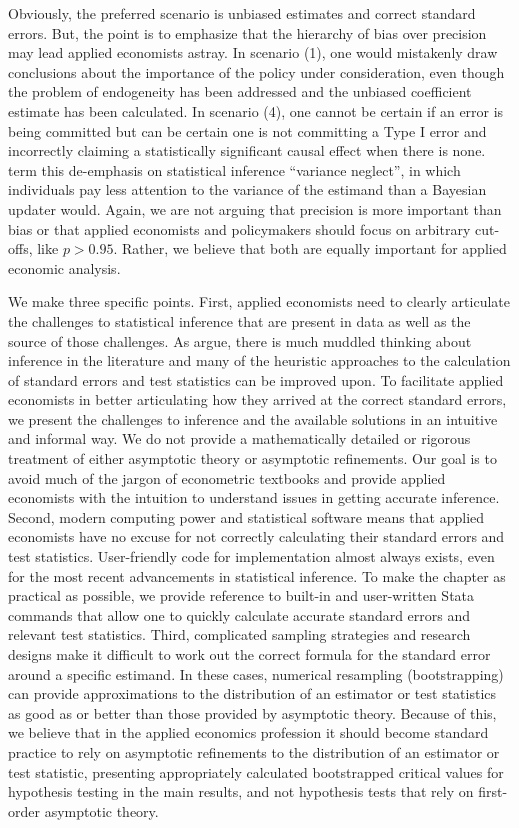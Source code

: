 \documentclass[11pt]{article}
\begin{document}
Obviously, the preferred scenario is unbiased estimates and correct standard errors. But, the point is to emphasize that the hierarchy of bias over precision may lead applied economists astray. In scenario (1), one would mistakenly draw conclusions about the importance of the policy under consideration, even though the problem of endogeneity has been addressed and the unbiased coefficient estimate has been calculated. In scenario (4), one cannot be certain if an error is being committed but can be certain one is not committing a Type I error and incorrectly claiming a statistically significant causal effect when there is none. \cite{vivalt_how_2021} term this de-emphasis on statistical inference ``variance neglect'', in which individuals pay less attention to the variance of the estimand than a Bayesian updater would. Again, we are not arguing that precision is more important than bias or that applied economists and policymakers should focus on arbitrary cut-offs, like $p > 0.95$. Rather, we believe that both are equally important for applied economic analysis.

We make three specific points. First, applied economists need to clearly articulate the challenges to statistical inference that are present in data as well as the source of those challenges. As \cite{abadie_samplingbased_2020} argue, there is much muddled thinking about inference in the literature and many of the heuristic approaches to the calculation of standard errors and test statistics can be improved upon. To facilitate applied economists in better articulating how they arrived at the correct standard errors, we present the challenges to inference and the available solutions in an intuitive and informal way. We do not provide a mathematically detailed or rigorous treatment of either asymptotic theory or asymptotic refinements. Our goal is to avoid much of the jargon of econometric textbooks and provide applied economists with the intuition to understand issues in getting accurate inference. Second, modern computing power and statistical software means that applied economists have no excuse for not correctly calculating their standard errors and test statistics. User-friendly code for implementation almost always exists, even for the most recent advancements in statistical inference. To make the chapter as practical as possible, we provide reference to built-in and user-written Stata commands that allow one to quickly calculate accurate standard errors and relevant test statistics. Third, complicated sampling strategies and research designs make it difficult to work out the correct formula for the standard error around a specific estimand. In these cases, numerical resampling (bootstrapping) can provide approximations to the distribution of an estimator or test statistics as good as or better than those provided by asymptotic theory. Because of this, we believe that in the applied economics profession it should become standard practice to rely on asymptotic refinements to the distribution of an estimator or test statistic, presenting appropriately calculated bootstrapped critical values for hypothesis testing in the main results, and not hypothesis tests that rely on first-order asymptotic theory.
\end{document}
